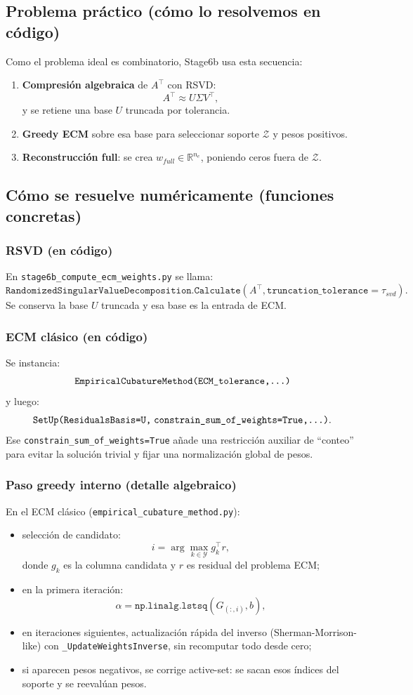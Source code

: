 \documentclass[11pt,a4paper]{article}
\begin{document}
\subsection{Problema práctico (cómo lo resolvemos en código)}
Como el problema ideal es combinatorio, Stage6b usa esta secuencia:
\begin{enumerate}[leftmargin=1.5em]
\item \textbf{Compresión algebraica} de $A^\top$ con RSVD:
\[
A^\top \approx U\Sigma V^\top,
\]
y se retiene una base $U$ truncada por tolerancia.
\item \textbf{Greedy ECM} sobre esa base para seleccionar soporte
$\mathcal Z$ y pesos positivos.
\item \textbf{Reconstrucción full}: se crea $w_{full}\in\mathbb{R}^{n_e}$,
poniendo ceros fuera de $\mathcal Z$.
\end{enumerate}

\subsection{Cómo se resuelve numéricamente (funciones concretas)}
\subsubsection*{RSVD (en código)}
En \texttt{stage6b\_compute\_ecm\_weights.py} se llama:
\[
\texttt{RandomizedSingularValueDecomposition.Calculate}(A^\top,\texttt{truncation\_tolerance}=\tau_{svd}).
\]
Se conserva la base $U$ truncada y esa base es la entrada de ECM.

\subsubsection*{ECM clásico (en código)}
Se instancia:
\[
\texttt{EmpiricalCubatureMethod(ECM\_tolerance,\dots)}
\]
y luego:
\[
\texttt{SetUp(ResidualsBasis=U,\;constrain\_sum\_of\_weights=True,\dots)}.
\]
Ese \texttt{constrain\_sum\_of\_weights=True} añade una restricción auxiliar
de ``conteo'' para evitar la solución trivial y fijar una normalización global de pesos.

\subsubsection*{Paso greedy interno (detalle algebraico)}
En el ECM clásico (\texttt{empirical\_cubature\_method.py}):
\begin{itemize}[leftmargin=1.5em]
\item selección de candidato:
\[
i=\arg\max_{k\in\mathcal Y} g_k^\top r,
\]
donde $g_k$ es la columna candidata y $r$ es residual del problema ECM;
\item en la primera iteración:
\[
\alpha=\texttt{np.linalg.lstsq}(G_{(:,i)},b),
\]
\item en iteraciones siguientes, actualización rápida del inverso (Sherman-Morrison-like)
con \texttt{\_UpdateWeightsInverse}, sin recomputar todo desde cero;
\item si aparecen pesos negativos, se corrige active-set:
se sacan esos índices del soporte y se reevalúan pesos.
\end{itemize}
\end{document}
